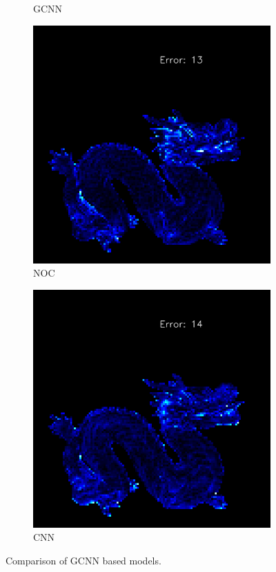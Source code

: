 \begin{figure}[H]
\begin{subfigure}[b]{0.24\linewidth}
		\caption{GCNN}
	\end{subfigure}
	\begin{subfigure}[b]{0.24\linewidth}
		\includegraphics[width=\linewidth]{./Figures/gcnn_synthetic/fancy_eval_7_error_GCNN-NOC.png}
		\caption{NOC}
	\end{subfigure}
	\begin{subfigure}[b]{0.24\linewidth}
		\includegraphics[width=\linewidth]{./Figures/gcnn_synthetic/fancy_eval_7_error_GCNN-CNN.png}
		\caption{CNN}
	\end{subfigure}
	
	\decoRule
	\caption{Comparison of GCNN based models.}
	\label{fig:gcnn-eval-multi-model}
\end{figure}


